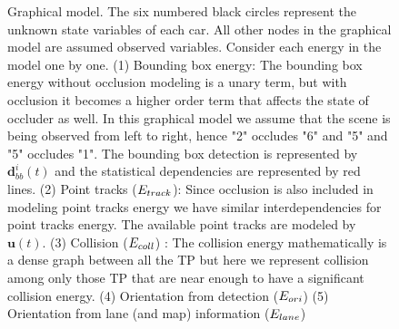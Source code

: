 \begin{figure}[!!t]
  \begin{center}
  
  \end{center}
  \caption{Graphical model. The six numbered black circles represent the
    unknown state variables of each car. All other nodes in the graphical model
    are assumed
    observed variables. Consider each energy in the model one by one. (1)
    Bounding box energy: The bounding box energy without occlusion modeling is
    a unary term, but with occlusion it becomes a higher order term that
    affects the state of occluder as well. In this graphical model we assume
    that the scene is being observed from left to right, hence "2" occludes "6"
    and "5" and "5" occludes "1". The bounding box detection is represented by
  $\mathbf{d}_{bb}^i(t)$ and the statistical dependencies are represented by
  red lines. (2) Point tracks ($E_{track}$): Since occlusion is also
  included in modeling point tracks energy we have similar interdependencies
  for point tracks energy. The available point tracks are modeled by
  $\mathbf{u}(t)$. (3) Collision ($E_{coll}$) : The collision energy
  mathematically is a dense graph between all the TP but here we represent
  collision among only those TP that are near enough to have a significant
collision energy. (4) Orientation from detection ($E_{ori}$) (5) Orientation from lane (and map) information ($E_{lane}$)}
  \label{fig:graphmodel}
\end{figure}
\begin{figure}
  \centering
  
\end{figure}
